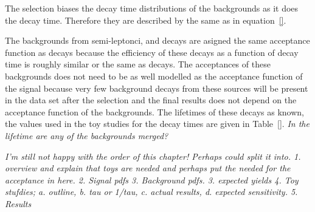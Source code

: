 {The selection biases the decay time distributions of the backgrounds as it does the \bsmumu decay time. Therefore they are described by the same \pdfs as in equation~\ref{}. 

The backgrounds from semi-leptonci, \bhh and \bdmumu decays are asigned the same acceptance function as \bsmumu decays because the efficiency of these decays as a function of decay time is roughly similar or the same as \bsmumu decays. The acceptances of these backgrounds does not need to be as well modelled as the acceptance function of the signal because very few background decays from these sources will be present in the data set after the selection and the final results does not depend on the acceptance function of the backgrounds. The lifetimes of these decays as known, the values used in the toy studies for the decay times \pdfs are given in Table~\ref{}. {\it In the lifetime are any of the backgrounds merged?}

{\it I'm still not happy with the order of this chapter! Perhaps could split it into. 1. overview and explain that toys are needed and perhaps put the needed for the acceptance in here. 2. Signal pdfs 3. Background pdfs. 3. expected yields 4. Toy stufdies; a. outline, b. tau or 1/tau, c. actual results, d. expected sensitivity. 5. Results}


}
